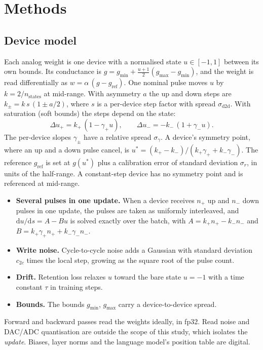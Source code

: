 \section{Methods}\label{sec:methods}

\subsection{Device model}\label{sec:model}
Each analog weight is one device with a normalised state $u\in[-1,1]$ between its own bounds. Its conductance is
$g=g_{\min}+\tfrac{u+1}{2}(g_{\max}-g_{\min})$, and the weight is read differentially as $w=\alpha\,(g-g_{\mathrm{ref}})$. One
nominal pulse moves $u$ by $k=2/n_{\mathrm{states}}$ at mid-range. With asymmetry $a$ the up and down steps are
$k_\pm=k\,s\,(1\pm a/2)$, where $s$ is a per-device step factor with spread $\sigma_{\mathrm{d2d}}$. With saturation (soft
bounds) the steps depend on the state:
\begin{equation}
\Delta u_+ = k_+\,(1-\gamma_+ u),\qquad \Delta u_- = -k_-\,(1+\gamma_- u).
\end{equation}
The per-device slopes $\gamma_\pm$ have a relative spread $\sigma_\gamma$. A device's symmetry point, where an up and a down
pulse cancel, is $u^*=(k_+-k_-)/(k_+\gamma_++k_-\gamma_-)$. The reference $g_{\mathrm{ref}}$ is set at $g(u^*)$ plus a calibration
error of standard deviation $\sigma_r$, in units of the half-range. A constant-step device has no symmetry point and is
referenced at mid-range.

\begin{itemize}
\item \textbf{Several pulses in one update.} When a device receives $n_+$ up and $n_-$ down pulses in one update, the pulses are
      taken as uniformly interleaved, and $\mathrm{d}u/\mathrm{d}s=A-Bu$ is solved exactly over the batch, with
      $A=k_+n_+-k_-n_-$ and $B=k_+\gamma_+n_++k_-\gamma_-n_-$.
\item \textbf{Write noise.} Cycle-to-cycle noise adds a Gaussian with standard deviation $c_{2c}$ times the local step, growing
      as the square root of the pulse count.
\item \textbf{Drift.} Retention loss relaxes $u$ toward the bare state $u=-1$ with a time constant $\tau$ in training steps.
\item \textbf{Bounds.} The bounds $g_{\min}$, $g_{\max}$ carry a device-to-device spread.
\end{itemize}

Forward and backward passes read the weights ideally, in fp32. Read noise and DAC/ADC quantisation are outside the scope of this
study, which isolates the \emph{update}. Biases, layer norms and the language model's position table are digital.


